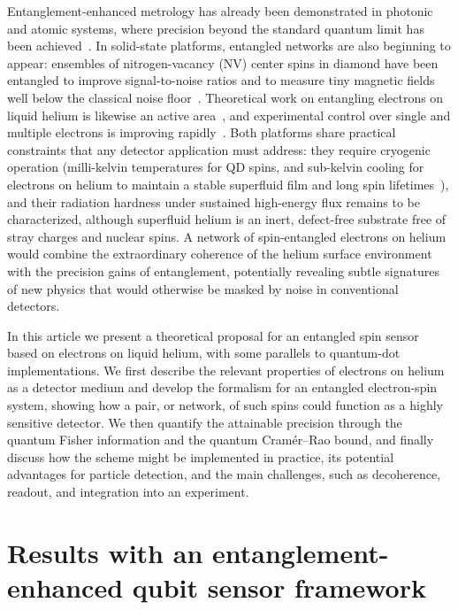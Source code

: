 \documentclass[fleqn,10pt]{wlscirep}
\begin{document}
Entanglement-enhanced metrology has already been demonstrated in photonic and atomic systems, where precision beyond the standard quantum limit has been achieved~\cite{aasi2013enhanced,wasilewski2010quantum,pezze2018quantum}. In solid-state platforms, entangled networks are also beginning to appear: ensembles of nitrogen-vacancy (NV) center spins in diamond have been entangled to improve signal-to-noise ratios and to measure tiny magnetic fields well below the classical noise floor~\cite{neumann2008multipartite,wu2025spin,zhou2025entanglement,Sekiguchi2024}. Theoretical work on entangling electrons on liquid helium is likewise an active area~\cite{mostameQuantumSimulatorIsing2008,zhangJaynesCummingsModelsTrapped2009,beysengulov2024,leinonen2025}, and experimental control over single and multiple electrons is improving rapidly~\cite{castoria2025,koolstra2026strong}. Both platforms share practical constraints that any detector application must address: they require cryogenic operation (milli-kelvin temperatures for QD spins, and sub-kelvin cooling for electrons on helium to maintain a stable superfluid film and long spin lifetimes~\cite{monarkha2013two,lyonSpinbasedQuantumComputing2006}), and their radiation hardness under sustained high-energy flux remains to be characterized, although superfluid helium is an inert, defect-free substrate free of stray charges and nuclear spins. A network of spin-entangled electrons on helium would combine the extraordinary coherence of the helium surface environment with the precision gains of entanglement, potentially revealing subtle signatures of new physics that would otherwise be masked by noise in conventional detectors.

In this article we present a theoretical proposal for an entangled spin sensor based on electrons on liquid helium, with some parallels to quantum-dot implementations. We first describe the relevant properties of electrons on helium as a detector medium and develop the formalism for an entangled electron-spin system, showing how a pair, or network, of such spins could function as a highly sensitive detector. We then quantify the attainable precision through the quantum Fisher information and the quantum Cram\'er--Rao bound, and finally discuss how the scheme might be implemented in practice, its potential advantages for particle detection, and the main challenges, such as decoherence, readout, and integration into an experiment.



\section{Results with an entanglement-enhanced qubit sensor framework}
\label{sec:formalism}
\end{document}
